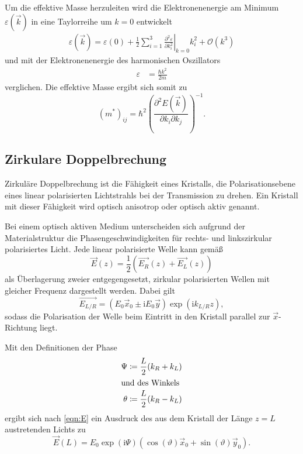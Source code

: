 Um die effektive Masse herzuleiten wird die Elektronenenergie am Minimum $\varepsilon(\vec{k})$ in eine Taylorreihe um $k=0$ entwickelt
\begin{align*}
    \varepsilon(\vec{k})=\varepsilon(0) + \frac{1}{2}\sum_{i=1}^3 \left. \frac{\partial^2 \varepsilon}{\partial k_i^2}\right|_{k=0}k_i^2 + \mathcal{O}(k^3)
\end{align*}
und mit der Elektronenenergie des harmonischen Oszillators
\begin{align*}
    \varepsilon &= \frac{\hbar k^2}{2m}
\end{align*}
verglichen.
Die effektive Masse ergibt sich somit zu
\begin{equation*}
    (m^*)_{ij} = \hbar^2 \left( \frac{\partial^2 E(\vec{k})}{\partial k_i \partial k_j} \right)^{-1}. 
\end{equation*}


\subsection{Zirkulare Doppelbrechung}
\label{sub:Doppelbrechung}
Zirkuläre Doppelbrechung ist die Fähigkeit eines Kristalls, die Polarisationsebene eines linear polarisierten Lichtstrahls bei der Transmission
zu drehen. Ein Kristall mit dieser Fähigkeit wird optisch anisotrop oder optisch aktiv genannt.

Bei einem optisch aktiven Medium unterscheiden sich aufgrund der Materialstruktur die Phasengeschwindigkeiten für rechts- und linkszirkular
polarisiertes Licht.
Jede linear polarisierte Welle kann gemäß
\begin{equation}
    \vec{E}(z)=\frac{1}{2}(\vec{E_R}(z)+\vec{E_L}(z))
    \label{eqn:E}   
\end{equation}
als Überlagerung zweier entgegengesetzt, zirkular polarisierten Wellen mit gleicher Frequenz dargestellt werden. Dabei gilt
\begin{equation*}
    \vec{E_{L/R}}=(E_0\vec{x}_0\pm \text{i}E_0\vec{y})\exp{(\text{i}k_{L/R}z)},
\end{equation*}
sodass die Polarisation der Welle beim Eintritt in den Kristall parallel zur $\vec{x}$-Richtung liegt.

Mit den Definitionen der Phase
\begin{align*}
    \Psi  &\coloneqq \frac{L}{2}(k_R+k_L)\\
    \shortintertext{und des Winkels}
    \theta&\coloneqq \frac{L}{2}(k_R-k_L)
\end{align*}
ergibt sich nach \autoref{eqn:E} ein Ausdruck des aus dem Kristall der Länge $z=L$ austretenden Lichts zu 
\begin{equation*}
    \vec{E}(L)=E_0 \exp(\text{i}\Psi)\left(\cos(\vartheta) \vec{x}_0 + \sin(\vartheta)\vec{y}_0\right).
\end{equation*}


